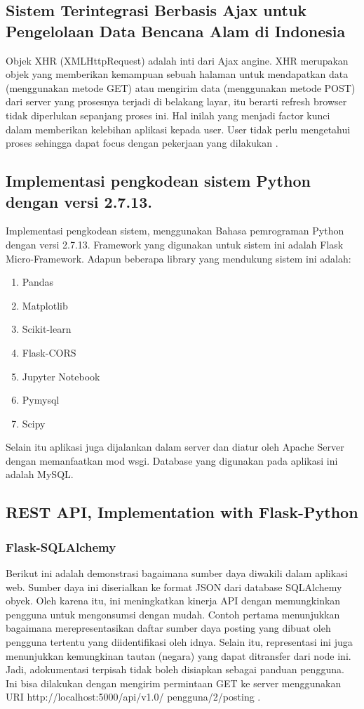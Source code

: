 \subsection{Sistem Terintegrasi Berbasis Ajax untuk Pengelolaan Data Bencana Alam di Indonesia}
Objek XHR (XMLHttpRequest) adalah inti dari Ajax angine. XHR merupakan objek yang memberikan kemampuan sebuah halaman untuk mendapatkan data (menggunakan metode GET) atau mengirim data (menggunakan metode POST) dari server yang prosesnya terjadi di belakang layar, itu berarti refresh browser tidak diperlukan sepanjang proses ini. Hal inilah yang menjadi factor kunci dalam memberikan kelebihan aplikasi kepada user. User tidak perlu mengetahui proses sehingga dapat focus dengan pekerjaan yang dilakukan \cite{prasetyo2007sistem}.
\subsection{Implementasi pengkodean sistem Python dengan versi 2.7.13.}
Implementasi pengkodean sistem, menggunakan Bahasa pemrograman Python dengan versi 2.7.13. Framework yang digunakan untuk sistem ini adalah Flask Micro-Framework. Adapun beberapa library yang mendukung sistem ini adalah:
\begin{enumerate}
\item Pandas
\item Matplotlib
\item Scikit-learn
\item Flask-CORS
\item Jupyter Notebook
\item Pymysql
\item Scipy
\end{enumerate}
Selain itu aplikasi juga dijalankan dalam server dan diatur oleh Apache Server dengan memanfaatkan mod wsgi. Database yang digunakan pada aplikasi ini adalah MySQL\cite{gunawan2018aplikasi}.
\subsection{REST API, Implementation with Flask-Python}
\subsubsection{Flask-SQLAlchemy}
Berikut ini adalah demonstrasi bagaimana sumber daya diwakili dalam aplikasi web.
Sumber daya ini diserialkan ke format JSON dari database SQLAlchemy obyek. Oleh karena itu, ini meningkatkan kinerja API dengan memungkinkan pengguna untuk mengonsumsi dengan mudah. Contoh pertama menunjukkan bagaimana merepresentasikan daftar sumber daya posting yang dibuat oleh pengguna tertentu yang diidentifikasi oleh idnya. Selain itu, representasi ini juga menunjukkan kemungkinan tautan (negara) yang dapat ditransfer dari node ini. Jadi, adokumentasi terpisah tidak boleh disiapkan sebagai panduan pengguna. Ini bisa dilakukan dengan mengirim permintaan GET ke server menggunakan URI http://localhost:5000/api/v1.0/ pengguna/2/posting \cite{alemu2014rest}.
